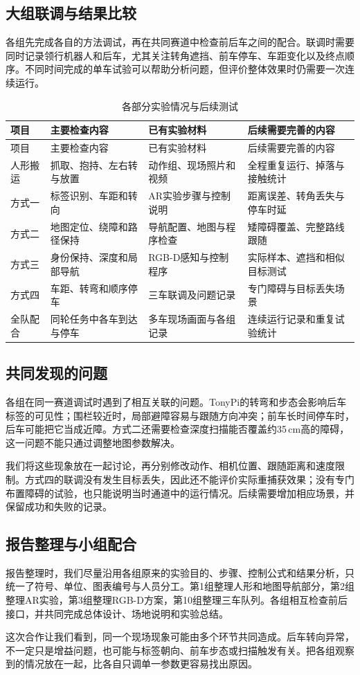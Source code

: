 \subsection{大组联调与结果比较}
各组先完成各自的方法调试，再在共同赛道中检查前后车之间的配合。联调时需要同时记录领行机器人和后车，尤其关注转角遮挡、前车停车、车距变化以及终点顺序。不同时间完成的单车试验可以帮助分析问题，但评价整体效果时仍需要一次连续运行。
\begin{longtable}{p{25mm}p{38mm}p{36mm}p{37mm}}
\caption{各部分实验情况与后续测试}\\\toprule
项目 & 主要检查内容 & 已有实验材料 & 后续需要完善的内容\\\midrule\endfirsthead
\toprule 项目 & 主要检查内容 & 已有实验材料 & 后续需要完善的内容\\\midrule\endhead
人形搬运 & 抓取、抱持、左右转与放置 & 动作组、现场照片和视频 & 全程重复运行、掉落与接触统计\\
方式一 & 标签识别、车距和转向 & AR实验步骤与控制说明 & 距离误差、转角丢失与停车时延\\
方式二 & 地图定位、绕障和路径保持 & 导航配置、地图与程序检查 & 矮障碍覆盖、完整路线跟随\\
方式三 & 身份保持、深度和局部导航 & RGB-D感知与控制程序 & 实际样本、遮挡和相似目标测试\\
方式四 & 车距、转弯和顺序停车 & 三车联调及问题记录 & 专门障碍与目标丢失场景\\
全队配合 & 同轮任务中各车到达与停车 & 多车现场画面与各组记录 & 连续运行记录和重复试验统计\\\bottomrule
\end{longtable}

\subsection{共同发现的问题}
各组在同一赛道调试时遇到了相互关联的问题。TonyPi的转弯和步态会影响后车标签的可见性；围栏较近时，局部避障容易与跟随方向冲突；前车长时间停车时，后车可能把它当成近障。方式二还需要检查深度扫描能否覆盖约35\,cm高的障碍，这一问题不能只通过调整地图参数解决。

我们将这些现象放在一起讨论，再分别修改动作、相机位置、跟随距离和速度限制。方式四的联调没有发生目标丢失，因此还不能评价实际重捕获效果；没有专门布置障碍的试验，也只能说明当时通道中的运行情况。后续需要增加相应场景，并保留成功和失败的记录。

\subsection{报告整理与小组配合}
报告整理时，我们尽量沿用各组原来的实验目的、步骤、控制公式和结果分析，只统一了符号、单位、图表编号与人员分工。第1组整理人形和地图导航部分，第2组整理AR实验，第3组整理RGB-D方案，第10组整理三车队列。各组相互检查前后接口，并共同完成总体设计、场地说明和实验总结。

这次合作让我们看到，同一个现场现象可能由多个环节共同造成。后车转向异常，不一定只是增益问题，也可能与标签朝向、前车步态或扫描触发有关。把各组观察到的情况放在一起，比各自只调单一参数更容易找出原因。
